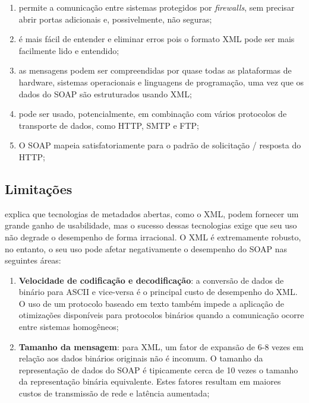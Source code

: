 \begin{enumerate}[label=\alph*)]

\item permite a comunicação entre sistemas protegidos por \textit{firewalls}, sem precisar abrir portas adicionais e, possivelmente, não seguras;

\item é mais fácil de entender e eliminar erros pois o formato XML pode ser mais facilmente lido e entendido;

\item as mensagens podem ser compreendidas por quase todas as plataformas de hardware, sistemas operacionais e linguagens de programação, uma vez que os dados do SOAP são estruturados usando XML;

\item pode ser usado, potencialmente, em combinação com vários protocolos de transporte de dados, como HTTP, SMTP e FTP;

\item O SOAP mapeia satisfatoriamente para o padrão de solicitação / resposta do HTTP;

\end{enumerate}

\subsection{Limitações}

 explica que tecnologias de metadados abertas, como o XML, podem fornecer um grande ganho de usabilidade, mas o sucesso dessas tecnologias exige que seu uso não degrade o desempenho de forma irracional. O XML é extremamente robusto, no entanto, o seu uso pode afetar negativamente o desempenho do SOAP nas seguintes áreas:

\begin{enumerate}[label=\alph*)]

    \item \textbf{Velocidade de codificação e decodificação}: a conversão de dados de binário para ASCII e vice-versa é o principal custo de desempenho do XML. O uso de um protocolo baseado em texto também impede a aplicação de otimizações disponíveis para protocolos binários quando a comunicação ocorre entre sistemas homogêneos;
    
    \item \textbf{Tamanho da mensagem}: para XML, um fator de expansão de 6-8 vezes em relação aos dados binários originais não é incomum. O tamanho da representação de dados do SOAP é tipicamente cerca de 10 vezes o tamanho da representação binária equivalente. Estes fatores resultam em maiores custos de transmissão de rede e latência aumentada;
    
\end{enumerate}

